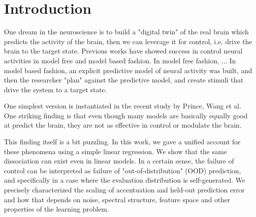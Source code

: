 \documentclass{article}
\theoremstyle{plain}
\theoremstyle{definition}
\begin{document}
\begin{abstract}
Extending the analysis to linear feature regression case, we show
that the generalization error and control error has different summary
statistics -- generalization error cares about feature space covariance
while control cares about the feature outer product themselves.

We specifically characterized the \textit{gauge invariance
group} of the feature map, which will not change the
classic generalization error and CV selection; but changes the control
/ accentuation error dramatically.

This shows our thesis that even for linear feature regression, prediction
and control can be dissociated, and inspire us to look deeper into
the gradient structure of feature maps.
\end{abstract}

\section{Introduction}
One dream in the neuroscience is to build a "digital twin" of the real brain which predicts the activity of the brain, then we can leverage it for control, i.e. drive the brain to the target state.
Previous works have showed success in control neural activities in model free and model based fashion.
In model free fashion, ...
In model based fashion, an explicit predictive model of neural activity was built, and then the researcher "plan" against the predictive model, and create stimuli that drive the system to a target state.

One simplest version is instantiated in the recent study by Prince, Wang et al.
One striking finding is that even though many models are basically equally good at predict the brain, they are not as effective in control or modulate the brain.

This finding itself is a bit puzzling.
In this work, we gave a unified account for these phenomena using a simple linear regression.
We show that the same dissociation can exist even in linear models.
In a certain sense, the failure of control can be interpreted as failure of "out-of-distribution" (OOD) prediction, and specifically in a case where the evaluation distribution is self-generated.
We precisely characterized the scaling of accentuation and held-out prediction error and how that depends on noise, spectral structure, feature space and other properties of the learning problem.
\end{document}
